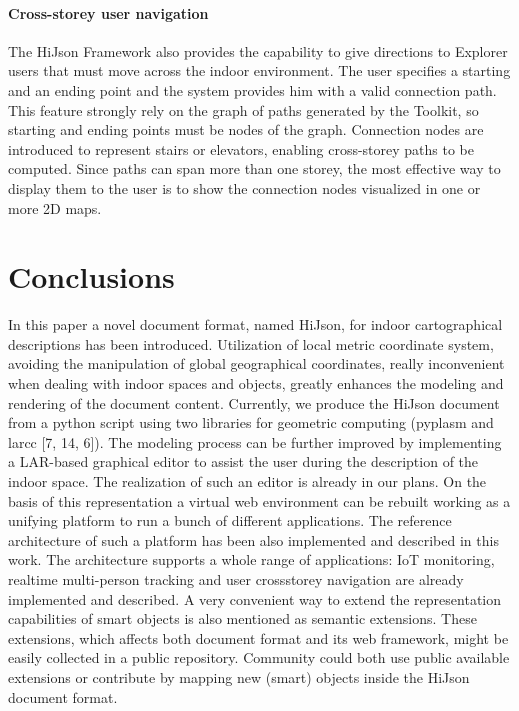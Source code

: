 \documentclass{sig-alternate}
\begin{document}
\paragraph{Cross-storey user navigation}
The HiJson Framework also provides the capability to give directions to Explorer users that must move across the indoor environment. The user specifies a starting and an ending point and the system provides him with a valid connection path. This feature strongly rely on the graph of paths generated by the Toolkit, so starting and ending points must be nodes of the graph. Connection nodes are introduced to represent stairs or elevators, enabling cross-storey paths to be computed. Since paths can span more than one storey, the most effective way to display them to the user is to show the connection nodes visualized in one or more 2D maps.


\section{Conclusions}

In this paper a novel document format, named HiJson, for indoor cartographical descriptions has been introduced. Utilization of local metric coordinate system, avoiding the manipulation of global geographical coordinates, really inconvenient when dealing with indoor spaces and objects, greatly enhances the modeling and rendering of the document content. Currently, we produce the HiJson document from a python script using two libraries for geometric computing (pyplasm and larcc [7, 14, 6]). The modeling process can be further improved by implementing a LAR-based graphical editor to assist the user during the description of the indoor space. The realization of such an editor is already in our plans.
On the basis of this representation a virtual web environment can be rebuilt working as a unifying platform to run a bunch of different applications. The reference architecture of such a platform has been also implemented and described in this work.
The architecture supports a whole range of applications: IoT monitoring, realtime multi-person tracking and user crossstorey navigation are already implemented and described. A very convenient way to extend the representation capabilities of smart objects is also mentioned as semantic extensions. These extensions, which affects both document format and its web framework, might be easily collected in a public repository. Community could both use public available extensions or contribute by mapping new (smart) objects inside the HiJson document format.


\end{document}

